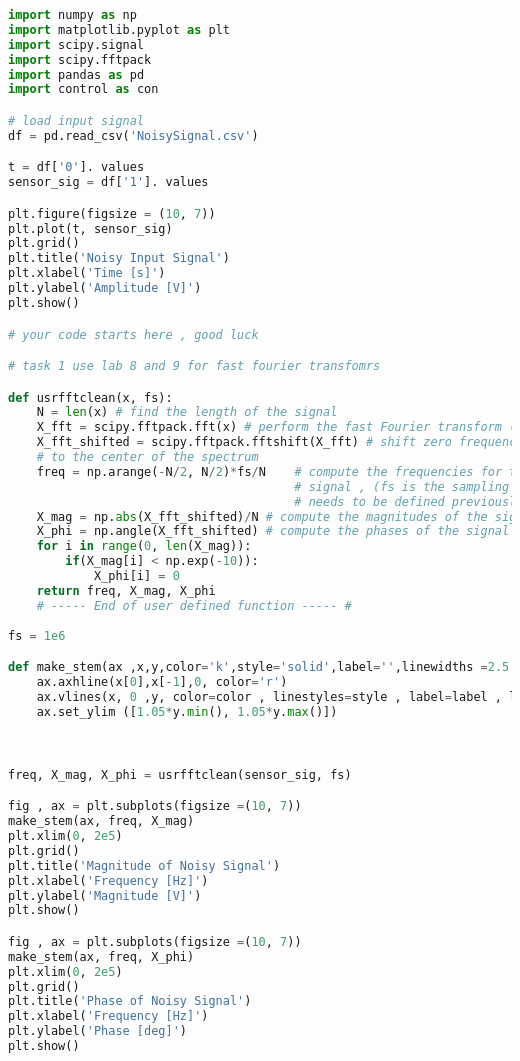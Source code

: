 \documentclass[11pt,a4]{article}
\begin{document}
\begin{lstlisting}[language=Python]
import numpy as np
import matplotlib.pyplot as plt
import scipy.signal
import scipy.fftpack  
import pandas as pd
import control as con

# load input signal
df = pd.read_csv('NoisySignal.csv')

t = df['0']. values
sensor_sig = df['1']. values

plt.figure(figsize = (10, 7))
plt.plot(t, sensor_sig)
plt.grid()
plt.title('Noisy Input Signal')
plt.xlabel('Time [s]')
plt.ylabel('Amplitude [V]')
plt.show()

# your code starts here , good luck

# task 1 use lab 8 and 9 for fast fourier transfomrs

def usrfftclean(x, fs):
    N = len(x) # find the length of the signal
    X_fft = scipy.fftpack.fft(x) # perform the fast Fourier transform (fft)
    X_fft_shifted = scipy.fftpack.fftshift(X_fft) # shift zero frequency components
    # to the center of the spectrum
    freq = np.arange(-N/2, N/2)*fs/N    # compute the frequencies for the output
                                        # signal , (fs is the sampling frequency and
                                        # needs to be defined previously in your code
    X_mag = np.abs(X_fft_shifted)/N # compute the magnitudes of the signal
    X_phi = np.angle(X_fft_shifted) # compute the phases of the signal
    for i in range(0, len(X_mag)):
        if(X_mag[i] < np.exp(-10)):
            X_phi[i] = 0
    return freq, X_mag, X_phi
    # ----- End of user defined function ----- #
    
fs = 1e6

def make_stem(ax ,x,y,color='k',style='solid',label='',linewidths =2.5 ,** kwargs):
    ax.axhline(x[0],x[-1],0, color='r')
    ax.vlines(x, 0 ,y, color=color , linestyles=style , label=label , linewidths=linewidths)
    ax.set_ylim ([1.05*y.min(), 1.05*y.max()])

    

freq, X_mag, X_phi = usrfftclean(sensor_sig, fs)

fig , ax = plt.subplots(figsize =(10, 7))
make_stem(ax, freq, X_mag)
plt.xlim(0, 2e5)
plt.grid()
plt.title('Magnitude of Noisy Signal')
plt.xlabel('Frequency [Hz]')
plt.ylabel('Magnitude [V]')
plt.show()

fig , ax = plt.subplots(figsize =(10, 7))
make_stem(ax, freq, X_phi)
plt.xlim(0, 2e5)
plt.grid()
plt.title('Phase of Noisy Signal')
plt.xlabel('Frequency [Hz]')
plt.ylabel('Phase [deg]')
plt.show()
\end{lstlisting}
\end{document}
